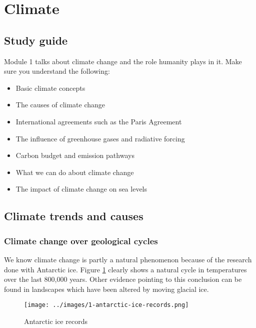 \documentclass[../summary.tex]{subfiles}
\begin{document}
\section{Climate}
\subsection{Study guide}
Module 1 talks about climate change and the role humanity plays in it. Make sure you understand the following:
\begin{itemize}
	\item Basic climate concepts
	\item The causes of climate change
	\item International agreements such as the Paris Agreement
	\item The influence of greenhouse gases and radiative forcing
	\item Carbon budget and emission pathways
	\item What we can do about climate change
	\item The impact of climate change on sea levels
\end{itemize}
\subsection{Climate trends and causes}
\subsubsection{Climate change over geological cycles}
We know climate change is partly a natural phenomenon because of the research done with Antarctic ice. Figure \ref{fig:antarctic-ice-records} clearly shows a natural cycle in temperatures over the last 800,000 years. Other evidence pointing to this conclusion can be found in landscapes which have been altered by moving glacial ice.
\begin{figure}[h]
	\centering
	\texttt{[image: ../images/1-antarctic-ice-records.png]}
	\caption{Antarctic ice records}
	\label{fig:antarctic-ice-records}
\end{figure}
\end{document}
